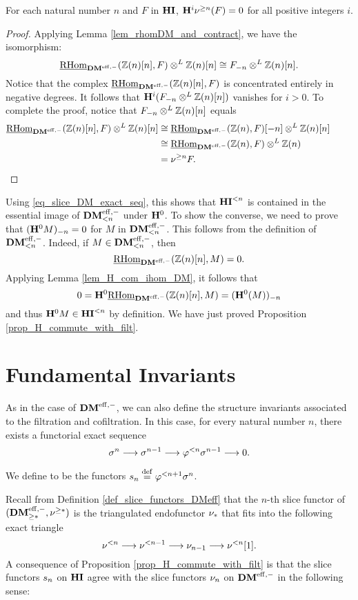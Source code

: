 \begin{lem}\label{lem_H1_sgDM_vanishes}
For each natural number $n$ and $F$ in $\HI$, $\HH^i \sgDM{n}(F) 
= 0$ for all positive integers $i$.
\end{lem}
\begin{proof}
Applying Lemma \ref{lem_rhomDM_and_contract}, we have the isomorphism:
\[
\ihomDMf(\Z(n)[n], F) \tDM \Z(n)[n] \cong \RHI[n]{F} \tDM \Z(n)[n].
\] 
Notice that the complex $\ihomDMf(\Z(n)[n], F)$
is concentrated entirely in negative degrees. It follows that 
$\HH^i(\RHI[n]{F} \tDM \Z(n)[n])$ vanishes for $i > 0$. To complete
the proof, notice that $\RHI[n]{F} \tDM \Z(n)[n]$ equals
\begin{align*}
\ihomDMf(\Z(n)[n], F) \tDM \Z(n)[n] &\cong
\ihomDMf(\Z(n), F)[-n] \tDM \Z(n)[n] \\
&\cong \ihomDMf(\Z(n), F) \tDM \Z(n) \\
&= \sgDM{n} F.  &\phantom{aai}\qedhere
\end{align*}
\end{proof}

Using \eqref{eq_slice_DM_exact_seq}, this shows that $\TFHI{n}$ is 
contained in the essential image of $\LFiltDM[n]{\DMeff}$ under 
$\HH^0$. To show the converse, we need to prove that 
$\RHI[n]{(\HH^0 M)} = 0$ for $M$ in $\LFiltDM[n]{\DMeff}$. This 
follows from the definition of $\LFiltDM[n]{\DMeff}$. Indeed, if 
$M \in \LFiltDM[n]{\DMeff}$, then 
\[
\ihomDMf(\Z(n)[n], M) = 0.
\] 
Applying Lemma \ref{lem_H_com_ihom_DM}, it follows that
\[
0 = \HH^0\ihomDMf(\Z(n)[n], M) = \RHI[n]{(\HH^0(M))}
\]
and thus $\HH^0 M \in \TFHI{n}$ by definition. We have just proved 
Proposition \ref{prop_H_commute_with_filt}.

\section{Fundamental Invariants}

As in the case of $\DMeff$, we can also define the structure 
invariants associated to the filtration and cofiltration. In this
case, for every natural number $n$, there exists a functorial 
exact sequence
\[
\sgHI{n} \to \sgHI{n - 1} \to \tlHI{n}\sgHI{n - 1} \to 0.
\]
\begin{defn}\label{defn_sliceHI}
We define  to be the functors 
$\slice{n} \defeq \tlHI{n + 1}\sgHI{n}$. 
\end{defn}

Recall from Definition \ref{def_slice_functors_DMeff} that the 
$n$-th slice functor of $(\GFiltDM{\DMeff}, 
\sgDM{*})$ is the triangulated endofunctor $\sliceDM{*}$ that
fits into the following exact triangle
\[
\slDM{n} \to \slDM{n - 1} \to \sliceDM{n - 1} \to \slDM{n}[1].
\]
A consequence of Proposition \ref{prop_H_commute_with_filt} is 
that the slice functors $\slice{n}$ on $\HI$ agree 
with the slice functors $\sliceDM{n}$ on $\DMeff$ in the following
sense:

